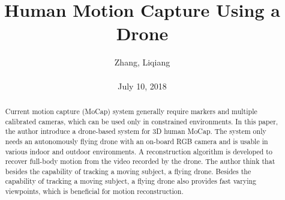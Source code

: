 \documentclass[10pt,twocolumn,letterpaper]{article}
\title{\textbf{Human Motion Capture Using a Drone}}
\author{Zhang, Liqiang\\\\July 10, 2018}
\begin{document}
\maketitle
\par
\begin{abstract}
Current motion capture (MoCap) system generally require markers and multiple calibrated cameras, which can be used only in constrained environments. In this paper, the author introduce a drone-based system for 3D human MoCap. The system only needs an autonomously flying drone with an on-board RGB camera and is usable in various indoor and outdoor environments. A reconstruction algorithm is developed to recover full-body motion from the video recorded by the drone. The author think that besides the capability of tracking a moving subject, a flying drone. Besides the capability of tracking a moving subject, a flying drone also provides fast varying viewpoints, which is beneficial for motion reconstruction. 
\end{abstract}
\end{document}
